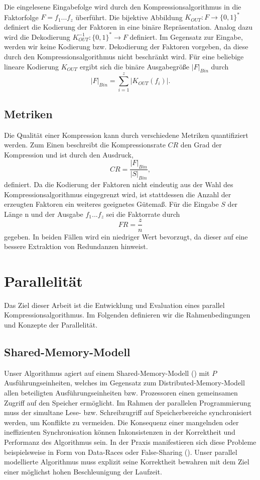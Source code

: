 Die eingelesene Eingabefolge wird durch den Kompressionsalgorithmus in die Faktorfolge $F=f_1...f_z$ überführt. Die bijektive Abbildung $K_{OUT}: F \rightarrow \{0,1\}^*$
definiert die Kodierung der Faktoren in eine binäre Repräsentation. Analog dazu wird die Dekodierung $K^{-1}_{OUT}: \{0,1\}^* \rightarrow F$ definiert. Im Gegensatz zur Eingabe, 
werden wir keine Kodierung bzw. Dekodierung der Faktoren vorgeben, da diese durch den Kompressionsalgorithmus nicht beschränkt wird. Für eine beliebige lineare Kodierung $K_{OUT}$
ergibt sich die binäre Ausgabegröße $|F|_{Bin}$ durch
\begin{equation}
    |F|_{Bin} = \sum_{i=1}^{z} |K_{OUT}(f_i)|.
\end{equation}

\subsection{Metriken}
Die Qualität einer Kompression kann durch verschiedene Metriken quantifiziert werden. Zum Einen beschreibt die Kompressionsrate $CR$ den Grad der Kompression und ist durch den
Ausdruck, 
\begin{equation}
    CR = \frac{|F|_{Bin}}{|S|_{Bin}},
\end{equation}
definiert.
Da die Kodierung der Faktoren nicht eindeutig aus der Wahl des Kompressionsalgorithmus eingegrenzt wird, ist stattdessen die Anzahl der erzeugten Faktoren ein
weiteres geeignetes Gütemaß. Für die Eingabe $S$ der Länge n und der Ausgabe $f_1...f_z$ sei die Faktorrate durch
\begin{equation}
    FR = \frac{z}{n}
\end{equation}
gegeben. In beiden Fällen wird ein niedriger Wert bevorzugt, da dieser auf eine bessere Extraktion von Redundanzen hinweist.

\section{Parallelität}
Das Ziel dieser Arbeit ist die Entwicklung und Evaluation eines parallel Kompressionsalgorithmus. Im Folgenden definieren wir die Rahmenbedingungen und Konzepte der Parallelität.

\subsection{Shared-Memory-Modell} \label{shared}
Unser Algorithmus agiert auf einem Shared-Memory-Modell (\cite{jaja}) mit $P$ Ausführungseinheiten, welches im Gegensatz zum Distributed-Memory-Modell allen beteiligten 
Ausführungseinheiten bzw. Prozessoren einen gemeinsamen Zugriff auf den Speicher ermöglicht. Im Rahmen der parallelen Programmierung muss der simultane Lese- bzw. Schreibzugriff auf
Speicherbereiche synchronisiert werden, um Konflikte zu vermeiden. Die Konsequenz einer mangelnden oder ineffizienten Synchronisation können Inkonsistenzen in der Korrektheit und
Performanz des Algorithmus sein. In der Praxis manifestieren sich diese Probleme beispielsweise in Form von Data-Races oder False-Sharing (\cite{parallelcomputing}). 
Unser parallel modellierte Algorithmus muss explizit seine Korrektheit bewahren mit dem Ziel einer möglichst hohen Beschleunigung der Laufzeit.


